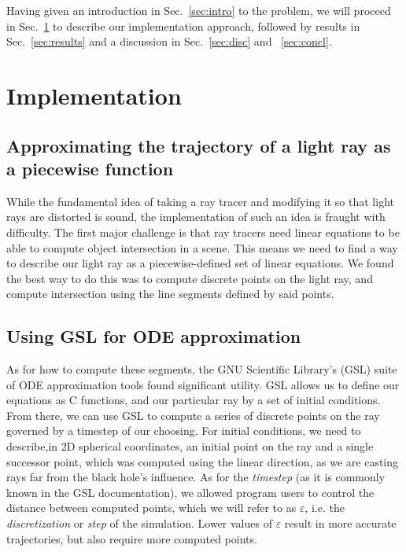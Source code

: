 

Having given an introduction in Sec.~\ref{sec:intro} to the problem, we will proceed in Sec.~\ref{sec:impl} to describe our implementation approach, followed by results in  Sec.~\ref{sec:results} and a discussion in Sec.~\ref{sec:disc} and ~\ref{sec:concl}.



\section{Implementation}
\label{sec:impl}


\subsection{Approximating the trajectory of a light ray as a piecewise function}
While the fundamental idea of taking a ray tracer and modifying it so that light rays are distorted is sound, the implementation of such an idea is fraught with difficulty. The first major challenge is that ray tracers need linear equations to be able to compute object intersection in a scene. This means we need to find a way to describe our light ray as a piecewise-defined set of linear equations. We found the best way to do this was to compute discrete points on the light ray, and compute intersection using the line segments defined by said points. 


\subsection{Using GSL for ODE approximation}
As for how to compute these segments, the GNU Scientific Library's (GSL) suite \cite{10.5555/1538674} of ODE approximation tools found significant utility. GSL allows us to define our equations as C functions, and our particular ray by a set of initial conditions. From there, we can use GSL to compute a series of discrete points on the ray governed by a timestep of our choosing. For initial conditions, we need to describe,in 2D spherical coordinates, an initial point on the ray and a single successor point, which was computed using the linear direction, as we are casting rays far from the black hole's influence. As for the \textit{timestep} (as it is commonly known in the GSL documentation), we allowed program users to control the distance between computed points, which we will refer to as $\varepsilon$, i.e. the \textit{discretization} or \textit{step} of the simulation. Lower values of $\varepsilon$ result in more accurate trajectories, but also require more computed points. 

